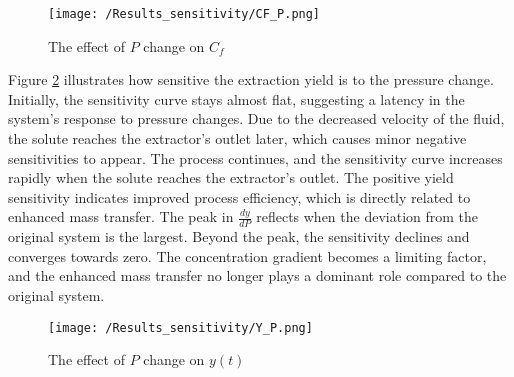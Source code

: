 \documentclass[../Article_Sensitivity_Analsysis.tex]{subfiles}
\begin{document}
	\begin{figure}[h!]
		\centering
		\texttt{[image: /Results\_sensitivity/CF\_P.png]}
		\caption{The effect of $P$ change on $C_f$}
		\label{fig:Sensitivty_P_CF}
	\end{figure}
	
	Figure \ref{fig:Sensitivty_P_y} illustrates how sensitive the extraction yield is to the pressure change. Initially, the sensitivity curve stays almost flat, suggesting a latency in the system's response to pressure changes. Due to the decreased velocity of the fluid, the solute reaches the extractor's outlet later, which causes minor negative sensitivities to appear. The process continues, and the sensitivity curve increases rapidly when the solute reaches the extractor's outlet. The positive yield sensitivity indicates improved process efficiency, which is directly related to enhanced mass transfer. The peak in $\frac{dy}{dP}$ reflects when the deviation from the original system is the largest. Beyond the peak, the sensitivity declines and converges towards zero. The concentration gradient becomes a limiting factor, and the enhanced mass transfer no longer plays a dominant role compared to the original system.
	
	\begin{figure}[h!]
		\centering
		\texttt{[image: /Results\_sensitivity/Y\_P.png]}
		\caption{The effect of $P$ change on $y(t)$}
		\label{fig:Sensitivty_P_y}
	\end{figure}
		
\end{document}
